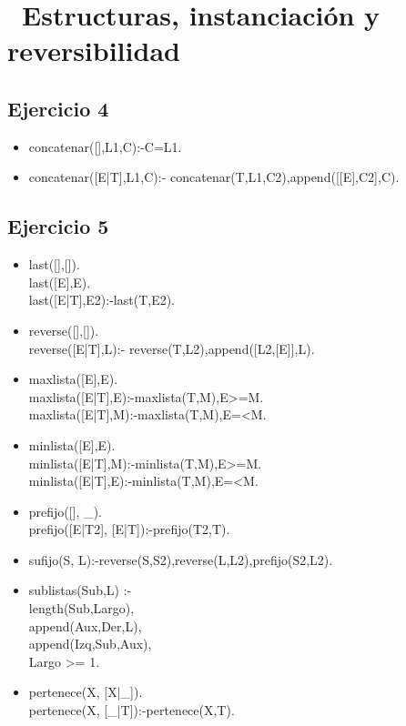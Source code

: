 \documentclass[10pt,a4paper]{article}
\begin{document}
\section*{\ Estructuras, instanciación y reversibilidad}

\subsection{Ejercicio 4}
\begin{itemize}
\item concatenar([],L1,C):-C=L1.
\item concatenar([E|T],L1,C):- concatenar(T,L1,C2),append([[E],C2],C).
\end{itemize}

\subsection{Ejercicio 5}
\begin{itemize}

\item last([],[]). \\
last([E],E). \\
last([E|T],E2):-last(T,E2).
\item reverse([],[]). \\
reverse([E|T],L):- reverse(T,L2),append([L2,[E]],L).
\item maxlista([E],E). \\
maxlista([E|T],E):-maxlista(T,M),E>=M. \\
maxlista([E|T],M):-maxlista(T,M),E=<M.
\item minlista([E],E). \\
minlista([E|T],M):-minlista(T,M),E>=M. \\
minlista([E|T],E):-minlista(T,M),E=<M.
\item prefijo([], _). \\
prefijo([E|T2], [E|T]):-prefijo(T2,T).
\item sufijo(S, L):-reverse(S,S2),reverse(L,L2),prefijo(S2,L2).
\item sublistas(Sub,L) :- \\
length(Sub,Largo), \\
append(Aux,Der,L), \\
append(Izq,Sub,Aux), \\
Largo >= 1.
\item pertenece(X, [X|_]). \\
pertenece(X, [_|T]):-pertenece(X,T).
\end{itemize}
\end{document}
